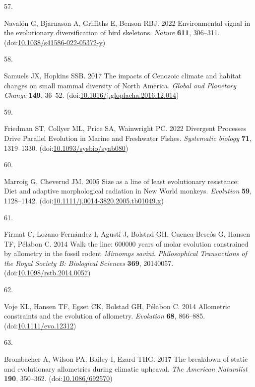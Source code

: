 \documentclass[
  11pt,
]{article}
\newlength{\cslhangindent}
\newlength{\csllabelwidth}
\newlength{\cslentryspacingunit} %
\newenvironment{CSLReferences}[2] %
 {%
  \setlength{\parindent}{0pt}
  \ifodd #1
  \let\oldpar\par
  \def\par{\hangindent=\cslhangindent\oldpar}
  \fi
  \setlength{\parskip}{#2\cslentryspacingunit}
 }%
 {}
\newcommand{\CSLLeftMargin}[1]{\parbox[t]{\csllabelwidth}{#1}}
\newcommand{\CSLRightInline}[1]{\parbox[t]{\linewidth - \csllabelwidth}{#1}\break}
\begin{document}
\begin{CSLReferences}{0}{0}
\leavevmode{}%
\CSLLeftMargin{57. }%
\CSLRightInline{Navalón G, Bjarnason A, Griffiths E, Benson RBJ. 2022
{Environmental signal in the evolutionary diversification of bird
skeletons}. \emph{Nature} \textbf{611}, 306--311.
(doi:\href{https://doi.org/10.1038/s41586-022-05372-y}{10.1038/s41586-022-05372-y})}

\leavevmode{}%
\CSLLeftMargin{58. }%
\CSLRightInline{Samuels JX, Hopkins SSB. 2017 {The impacts of {C}enozoic
climate and habitat changes on small mammal diversity of {N}orth
{A}merica}. \emph{Global and Planetary Change} \textbf{149}, 36--52.
(doi:\href{https://doi.org/10.1016/j.gloplacha.2016.12.014}{10.1016/j.gloplacha.2016.12.014})}

\leavevmode{}%
\CSLLeftMargin{59. }%
\CSLRightInline{Friedman ST, Collyer ML, Price SA, Wainwright PC. 2022
{Divergent Processes Drive Parallel Evolution in Marine and Freshwater
Fishes}. \emph{Systematic biology} \textbf{71}, 1319--1330.
(doi:\href{https://doi.org/10.1093/sysbio/syab080}{10.1093/sysbio/syab080})}

\leavevmode{}%
\CSLLeftMargin{60. }%
\CSLRightInline{Marroig G, Cheverud JM. 2005 Size as a line of least
evolutionary resistance: Diet and adaptive morphological radiation in
{N}ew {W}orld monkeys. \emph{Evolution} \textbf{59}, 1128--1142.
(doi:\href{https://doi.org/10.1111/j.0014-3820.2005.tb01049.x}{10.1111/j.0014-3820.2005.tb01049.x})}

\leavevmode{}%
\CSLLeftMargin{61. }%
\CSLRightInline{Firmat C, Lozano-Fernández I, Agustí J, Bolstad GH,
Cuenca-Bescós G, Hansen TF, Pélabon C. 2014 Walk the line: 600000 years
of molar evolution constrained by allometry in the fossil rodent
\emph{{M}imomys savini}. \emph{Philosophical Transactions of the Royal
Society B: Biological Sciences} \textbf{369}, 20140057.
(doi:\href{https://doi.org/10.1098/rstb.2014.0057}{10.1098/rstb.2014.0057})}

\leavevmode{}%
\CSLLeftMargin{62. }%
\CSLRightInline{Voje KL, Hansen TF, Egset CK, Bolstad GH, Pélabon C.
2014 Allometric constraints and the evolution of allometry.
\emph{Evolution} \textbf{68}, 866--885.
(doi:\href{https://doi.org/10.1111/evo.12312}{10.1111/evo.12312})}

\leavevmode{}%
\CSLLeftMargin{63. }%
\CSLRightInline{Brombacher A, Wilson PA, Bailey I, Ezard THG. 2017 The
breakdown of static and evolutionary allometries during climatic
upheaval. \emph{The American Naturalist} \textbf{190}, 350--362.
(doi:\href{https://doi.org/10.1086/692570}{10.1086/692570})}


\end{CSLReferences}
\end{document}
